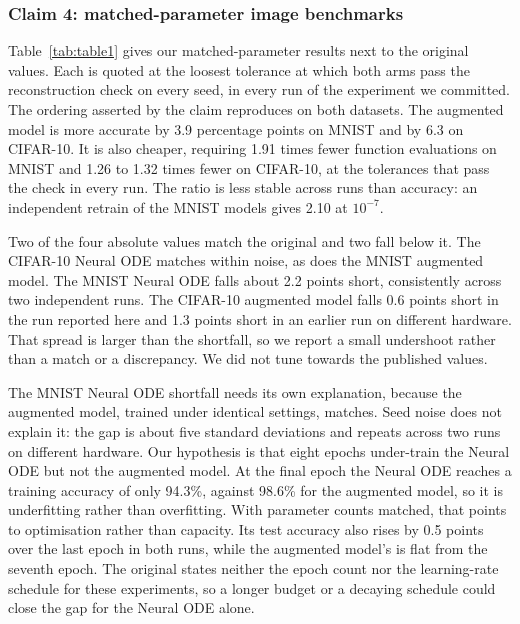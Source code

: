 \subsubsection{Claim 4: matched-parameter image benchmarks}

Table~\ref{tab:table1} gives our matched-parameter results next to the original values. Each
is quoted at the loosest tolerance at which both arms pass the reconstruction check on every
seed, in every run of the experiment we committed. The ordering asserted by the claim reproduces on both datasets. The augmented model is
more accurate by 3.9 percentage points on MNIST and by 6.3 on CIFAR-10. It is also cheaper,
requiring 1.91 times fewer function evaluations on MNIST and 1.26 to 1.32 times fewer on
CIFAR-10, at the tolerances that pass the check in every run. The ratio is less stable across
runs than accuracy: an independent retrain of the MNIST models gives 2.10 at $10^{-7}$.

Two of the four absolute values match the original and two fall below it. The CIFAR-10 Neural
ODE matches within noise, as does the MNIST augmented model. The MNIST Neural ODE falls about
2.2 points short, consistently across two independent runs. The CIFAR-10 augmented model falls
0.6 points short in the run reported here and 1.3 points short in an earlier run on different
hardware. That spread is larger than the shortfall, so we report a small undershoot rather
than a match or a discrepancy. We did not tune towards the published values.

The MNIST Neural ODE shortfall needs its own explanation, because the augmented model,
trained under identical settings, matches. Seed noise does not explain it: the gap is about
five standard deviations and repeats across two runs on different hardware. Our hypothesis is
that eight epochs under-train the Neural ODE but not the augmented model. At the final epoch
the Neural ODE reaches a training accuracy of only 94.3\%, against 98.6\% for the augmented
model, so it is underfitting rather than overfitting. With parameter counts matched, that points to
optimisation rather than capacity. Its test accuracy also rises by 0.5 points over
the last epoch in both runs, while the augmented model's is flat from the seventh epoch. The
original states neither the epoch count nor the learning-rate schedule for these experiments,
so a longer budget or a decaying schedule could close the gap for the Neural ODE alone.

